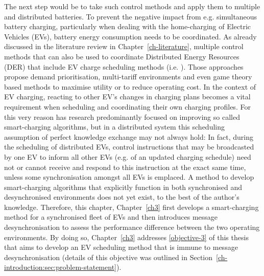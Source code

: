 The next step would be to take such control methods and apply them to multiple and distributed batteries.
To prevent the negative impact from e.g. simultaneous battery charging, particularly when dealing with the home-charging of Electric Vehicles (EVs), battery energy consumption needs to be coordinated.
As already discussed in the literature review in Chapter~\ref{ch-literature}, multiple control methods that can also be used to coordinate Distributed Energy Resources (DER) that include EV charge scheduling methods (i.e. \cite{Atia2016, Bidram2012, Bidram2014, Dolan2012, Gill2014, Guerrero2008, Guerrero2013, Sugihara2013, Toledo2013, Wang2016, Vovos2007, Guerrero2013a, Mansouri-Samani1993, Marra2013, Mokhtari2013}). 
Those approaches propose demand prioritisation, multi-tariff environments and even game theory based methods to maximise utility or to reduce operating cost.
In the context of EV charging, reacting to other EV's changes in charging plans becomes a vital requirement when scheduling and coordinating their own charging profiles.
For this very reason has research predominantly focused on improving so called smart-charging algorithms, but in a distributed system this scheduling assumption of perfect knowledge exchange may not always hold:
In fact, during the scheduling of distributed EVs, control instructions that may be broadcasted by one EV to inform all other EVs (e.g. of an updated charging schedule) need not or cannot receive and respond to this instruction at the exact same time, unless some synchronisation amongst all EVs is emplaced.
A method to develop smart-charging algorithms that explicitly function in both synchronised and desynchronised environments does not yet exist, to the best of the author's knowledge.
Therefore, this chapter, Chapter~\ref{ch3} first develops a smart-charging method for a synchronised fleet of EVs and then introduces message desynchronisation to assess the performance difference between the two operating environments.
By doing so, Chapter~\ref{ch3} addresses \ref{objective-3} of this thesis that aims to develop an EV scheduling method that is immune to message desynchronisation (details of this objective was outlined in Section~\ref{ch-introduction:sec:problem-statement}).


